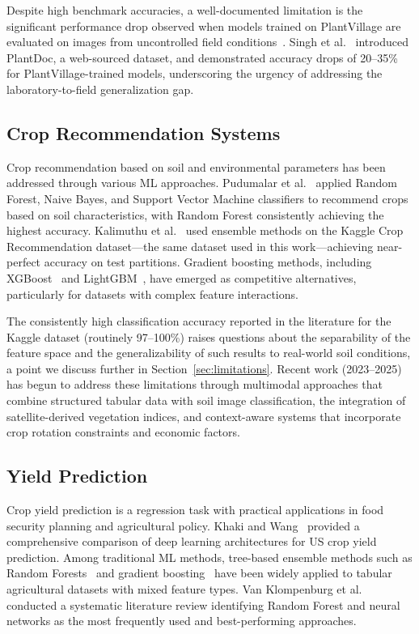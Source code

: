 \documentclass[conference]{IEEEtran}
\begin{document}
Despite high benchmark accuracies, a well-documented limitation is the significant performance drop observed when models trained on PlantVillage are evaluated on images from uncontrolled field conditions~\cite{barbedo2018factors}. Singh et al.~\cite{singh2018plantdoc} introduced PlantDoc, a web-sourced dataset, and demonstrated accuracy drops of 20--35\% for PlantVillage-trained models, underscoring the urgency of addressing the laboratory-to-field generalization gap.

\subsection{Crop Recommendation Systems}

Crop recommendation based on soil and environmental parameters has been addressed through various ML approaches. Pudumalar et al.~\cite{pudumalar2017crop} applied Random Forest, Naive Bayes, and Support Vector Machine classifiers to recommend crops based on soil characteristics, with Random Forest consistently achieving the highest accuracy. Kalimuthu et al.~\cite{kalimuthu2020crop} used ensemble methods on the Kaggle Crop Recommendation dataset---the same dataset used in this work---achieving near-perfect accuracy on test partitions. Gradient boosting methods, including XGBoost~\cite{chen2016xgboost} and LightGBM~\cite{ke2017lightgbm}, have emerged as competitive alternatives, particularly for datasets with complex feature interactions.

The consistently high classification accuracy reported in the literature for the Kaggle dataset (routinely 97--100\%) raises questions about the separability of the feature space and the generalizability of such results to real-world soil conditions, a point we discuss further in Section~\ref{sec:limitations}. Recent work (2023--2025) has begun to address these limitations through multimodal approaches that combine structured tabular data with soil image classification, the integration of satellite-derived vegetation indices, and context-aware systems that incorporate crop rotation constraints and economic factors.

\subsection{Yield Prediction}

Crop yield prediction is a regression task with practical applications in food security planning and agricultural policy. Khaki and Wang~\cite{khaki2020comprehensive} provided a comprehensive comparison of deep learning architectures for US crop yield prediction. Among traditional ML methods, tree-based ensemble methods such as Random Forests~\cite{jeong2016random} and gradient boosting~\cite{chen2016xgboost} have been widely applied to tabular agricultural datasets with mixed feature types. Van Klompenburg et al.~\cite{vanklompenburg2020crop} conducted a systematic literature review identifying Random Forest and neural networks as the most frequently used and best-performing approaches.
\end{document}
